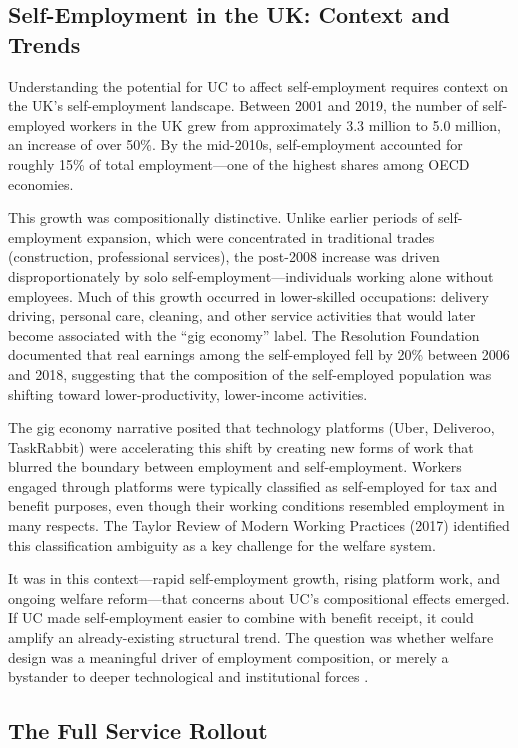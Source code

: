 \documentclass[12pt]{article}
\begin{document}
\subsection{Self-Employment in the UK: Context and Trends}

Understanding the potential for UC to affect self-employment requires context on the UK's self-employment landscape. Between 2001 and 2019, the number of self-employed workers in the UK grew from approximately 3.3 million to 5.0 million, an increase of over 50\%. By the mid-2010s, self-employment accounted for roughly 15\% of total employment---one of the highest shares among OECD economies.

This growth was compositionally distinctive. Unlike earlier periods of self-employment expansion, which were concentrated in traditional trades (construction, professional services), the post-2008 increase was driven disproportionately by solo self-employment---individuals working alone without employees. Much of this growth occurred in lower-skilled occupations: delivery driving, personal care, cleaning, and other service activities that would later become associated with the ``gig economy'' label. The Resolution Foundation documented that real earnings among the self-employed fell by 20\% between 2006 and 2018, suggesting that the composition of the self-employed population was shifting toward lower-productivity, lower-income activities.

The gig economy narrative posited that technology platforms (Uber, Deliveroo, TaskRabbit) were accelerating this shift by creating new forms of work that blurred the boundary between employment and self-employment. Workers engaged through platforms were typically classified as self-employed for tax and benefit purposes, even though their working conditions resembled employment in many respects. The Taylor Review of Modern Working Practices (2017) identified this classification ambiguity as a key challenge for the welfare system.

It was in this context---rapid self-employment growth, rising platform work, and ongoing welfare reform---that concerns about UC's compositional effects emerged. If UC made self-employment easier to combine with benefit receipt, it could amplify an already-existing structural trend. The question was whether welfare design was a meaningful driver of employment composition, or merely a bystander to deeper technological and institutional forces \citep{katzRiseAlternativeWork2019}.

\subsection{The Full Service Rollout}
\end{document}
